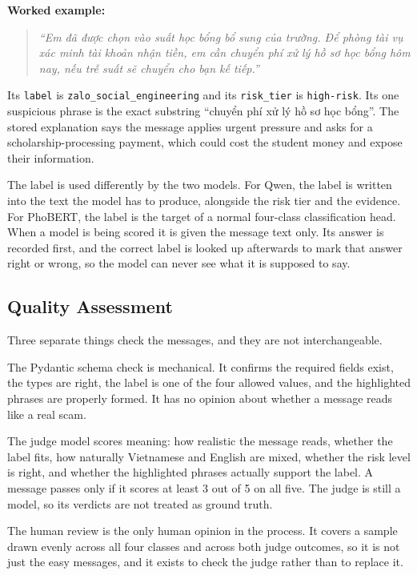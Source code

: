 \noindent\textbf{Worked example:}
\begin{quote}\small\itshape
``Em đã được chọn vào suất học bổng bổ sung của trường. Để phòng tài vụ xác minh tài khoản nhận tiền, em cần chuyển phí xử lý hồ sơ học bổng hôm nay, nếu trễ suất sẽ chuyển cho bạn kế tiếp.''
\end{quote}
Its \texttt{label} is \texttt{zalo\_social\_engineering} and its \texttt{risk\_tier} is \texttt{high-risk}. Its one suspicious phrase is the exact substring ``chuyển phí xử lý hồ sơ học bổng''. The stored explanation says the message applies urgent pressure and asks for a scholarship-processing payment, which could cost the student money and expose their information.

The label is used differently by the two models. For Qwen, the label is written into the text the model has to produce, alongside the risk tier and the evidence. For PhoBERT, the label is the target of a normal four-class classification head. When a model is being scored it is given the message text only. Its answer is recorded first, and the correct label is looked up afterwards to mark that answer right or wrong, so the model can never see what it is supposed to say.

\label{sec:quality-check}
\subsection*{Quality Assessment}

Three separate things check the messages, and they are not interchangeable.

The Pydantic schema check is mechanical. It confirms the required fields exist, the types are right, the label is one of the four allowed values, and the highlighted phrases are properly formed. It has no opinion about whether a message reads like a real scam.

The judge model scores meaning: how realistic the message reads, whether the label fits, how naturally Vietnamese and English are mixed, whether the risk level is right, and whether the highlighted phrases actually support the label. A message passes only if it scores at least 3 out of 5 on all five. The judge is still a model, so its verdicts are not treated as ground truth.

The human review is the only human opinion in the process. It covers a sample drawn evenly across all four classes and across both judge outcomes, so it is not just the easy messages, and it exists to check the judge rather than to replace it.

